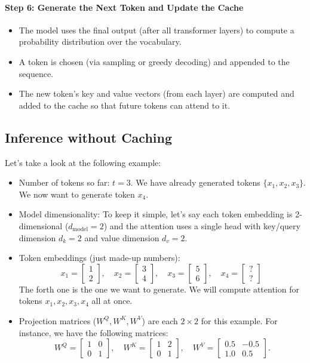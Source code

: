 \paragraph{Step 6: Generate the Next Token and Update the Cache}
\begin{itemize}
	\item The model uses the final output (after all transformer layers) to compute a probability distribution over the vocabulary.
	\item A token is chosen (\eg via sampling or greedy decoding) and appended to the sequence.
	\item The new token's key and value vectors (from each layer) are computed and added to the cache so that future tokens can attend to it.
\end{itemize}

\subsection{Inference without Caching}

Let's take a look at the following example:
\begin{itemize}
	\item Number of tokens so far: \(t=3\). We have already generated tokens \(\{x_1, x_2, x_3\}\). We now want to generate token \(x_4\).  
	\item Model dimensionality: To keep it simple, let's say each token embedding is 2-dimensional (\(d_{\text{model}} = 2\)) and the attention uses a single head with key/query dimension \(d_k = 2\) and value dimension \(d_v = 2\). 
	\item Token embeddings (just made-up numbers):
	  \[
		x_1 = \begin{bmatrix}1 \\ 2\end{bmatrix}, \quad
		x_2 = \begin{bmatrix}3 \\ 4\end{bmatrix}, \quad
		x_3 = \begin{bmatrix}5 \\ 6\end{bmatrix}, \quad
		x_4 = \begin{bmatrix}? \\ ?\end{bmatrix} \; 
	  \]
	  The forth one is the one we want to generate. We will compute attention for tokens \(x_1, x_2, x_3, x_4\) all at once.  
  \item Projection matrices (\(W^Q, W^K, W^V\)) are each \(2 \times 2\) for this example. For instance, we have the following matrices:
  \[
    W^Q = \begin{bmatrix}1 & 0 \\[6pt] 0 & 1\end{bmatrix}, \quad
    W^K = \begin{bmatrix}1 & 2 \\[6pt] 0 & 1\end{bmatrix}, \quad
    W^V = \begin{bmatrix}0.5 & -0.5 \\[6pt] 1.0 & 0.5\end{bmatrix}.
  \]
\end{itemize}

